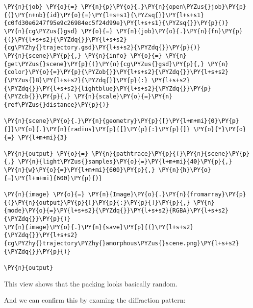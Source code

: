     \begin{tcolorbox}[breakable, size=fbox, boxrule=1pt, pad at break*=1mm,colback=cellbackground, colframe=cellborder]
\begin{Verbatim}[commandchars=\\\{\}]
\PY{n}{job} \PY{o}{=} \PY{n}{p}\PY{o}{.}\PY{n}{open\PYZus{}job}\PY{p}{(}\PY{n+nb}{id}\PY{o}{=}\PY{l+s+s1}{\PYZsq{}}\PY{l+s+s1}{c0fd30e6247f95e9c26984ec5f24d99e}\PY{l+s+s1}{\PYZsq{}}\PY{p}{)}
\PY{n}{cg\PYZus{}gsd} \PY{o}{=} \PY{n}{job}\PY{o}{.}\PY{n}{fn}\PY{p}{(}\PY{l+s+s2}{\PYZdq{}}\PY{l+s+s2}{cg\PYZhy{}trajectory.gsd}\PY{l+s+s2}{\PYZdq{}}\PY{p}{)}
\PY{n}{scene}\PY{p}{,} \PY{n}{info} \PY{o}{=} \PY{n}{get\PYZus{}scene}\PY{p}{(}\PY{n}{cg\PYZus{}gsd}\PY{p}{,} \PY{n}{color}\PY{o}{=}\PY{p}{\PYZob{}}\PY{l+s+s2}{\PYZdq{}}\PY{l+s+s2}{\PYZus{}B}\PY{l+s+s2}{\PYZdq{}}\PY{p}{:} \PY{l+s+s2}{\PYZdq{}}\PY{l+s+s2}{lightblue}\PY{l+s+s2}{\PYZdq{}}\PY{p}{\PYZcb{}}\PY{p}{,} \PY{n}{scale}\PY{o}{=}\PY{n}{ref\PYZus{}distance}\PY{p}{)}

\PY{n}{scene}\PY{o}{.}\PY{n}{geometry}\PY{p}{[}\PY{l+m+mi}{0}\PY{p}{]}\PY{o}{.}\PY{n}{radius}\PY{p}{[}\PY{p}{:}\PY{p}{]} \PY{o}{*}\PY{o}{=} \PY{l+m+mi}{3}

\PY{n}{output} \PY{o}{=} \PY{n}{pathtrace}\PY{p}{(}\PY{n}{scene}\PY{p}{,} \PY{n}{light\PYZus{}samples}\PY{o}{=}\PY{l+m+mi}{40}\PY{p}{,} \PY{n}{w}\PY{o}{=}\PY{l+m+mi}{600}\PY{p}{,} \PY{n}{h}\PY{o}{=}\PY{l+m+mi}{600}\PY{p}{)}

\PY{n}{image} \PY{o}{=} \PY{n}{Image}\PY{o}{.}\PY{n}{fromarray}\PY{p}{(}\PY{n}{output}\PY{p}{[}\PY{p}{:}\PY{p}{]}\PY{p}{,} \PY{n}{mode}\PY{o}{=}\PY{l+s+s2}{\PYZdq{}}\PY{l+s+s2}{RGBA}\PY{l+s+s2}{\PYZdq{}}\PY{p}{)}
\PY{n}{image}\PY{o}{.}\PY{n}{save}\PY{p}{(}\PY{l+s+s2}{\PYZdq{}}\PY{l+s+s2}{cg\PYZhy{}trajectory\PYZhy{}amorphous\PYZus{}scene.png}\PY{l+s+s2}{\PYZdq{}}\PY{p}{)}

\PY{n}{output}
\end{Verbatim}
\end{tcolorbox}
 
            
    
    \begin{center}
    \end{center}
    

    This view shows that the packing looks basically random.

And we can confirm this by examing the diffraction pattern:

